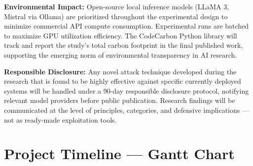 \documentclass[12pt,a4paper]{article}
\begin{document}
\textbf{Environmental Impact:} Open-source local inference models (LLaMA 3, Mistral via Ollama) are prioritized throughout the experimental design to minimize commercial API compute consumption. Experimental runs are batched to maximize GPU utilization efficiency. The CodeCarbon Python library will track and report the study's total carbon footprint in the final published work, supporting the emerging norm of environmental transparency in AI research.

\textbf{Responsible Disclosure:} Any novel attack technique developed during the research that is found to be highly effective against specific currently deployed systems will be handled under a 90-day responsible disclosure protocol, notifying relevant model providers before public publication. Research findings will be communicated at the level of principles, categories, and defensive implications — not as ready-made exploitation tools.

\section{Project Timeline — Gantt Chart}
\end{document}
